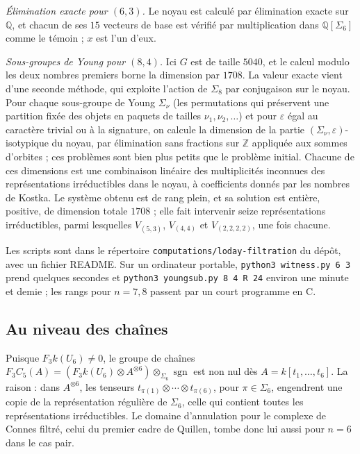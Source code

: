 \documentclass[11pt,a4paper]{amsart}
\theoremstyle{definition}
\theoremstyle{plain}
\theoremstyle{remark}
\newcommand{\Q}{\mathbb Q}
\newcommand{\sgn}{\operatorname{sgn}}
\begin{document}
\emph{Élimination exacte pour $(6, 3)$.} Le noyau est calculé par élimination exacte sur $\Q$, et chacun de ses $15$ vecteurs de base est vérifié par multiplication dans $\Q[\Sigma_6]$ comme le témoin ; $x$ est l'un d'eux.

\emph{Sous-groupes de Young pour $(8, 4)$.} Ici $G$ est de taille $5040$, et le calcul modulo les deux nombres premiers borne la dimension par $1708$. La valeur exacte vient d'une seconde méthode, qui exploite l'action de $\Sigma_8$ par conjugaison sur le noyau. Pour chaque sous-groupe de Young $\Sigma_\nu$ (les permutations qui préservent une partition fixée des objets en paquets de tailles $\nu_1, \nu_2, \dots$) et pour $\varepsilon$ égal au caractère trivial ou à la signature, on calcule la dimension de la partie $(\Sigma_\nu, \varepsilon)$-isotypique du noyau, par élimination sans fractions sur $\mathbb Z$ appliquée aux sommes d'orbites ; ces problèmes sont bien plus petits que le problème initial. Chacune de ces dimensions est une combinaison linéaire des multiplicités inconnues des représentations irréductibles dans le noyau, à coefficients donnés par les nombres de Kostka. Le système obtenu est de rang plein, et sa solution est entière, positive, de dimension totale $1708$ ; elle fait intervenir seize représentations irréductibles, parmi lesquelles $V_{(5,3)}$, $V_{(4,4)}$ et $V_{(2,2,2,2)}$, une fois chacune.

Les scripts sont dans le répertoire \texttt{computations/loday-filtration} du dépôt, avec un fichier README. Sur un ordinateur portable, \texttt{python3 witness.py 6 3} prend quelques secondes et \texttt{python3 youngsub.py 8 4 R 24} environ une minute et demie ; les rangs pour $n = 7, 8$ passent par un court programme en C.

\subsection{Au niveau des chaînes}

Puisque $F_3 k(U_6) \ne 0$, le groupe de chaînes $F_3 C_5(A) = (F_3 k(U_6) \otimes A^{\otimes 6}) \otimes_{\Sigma_6} \sgn$ est non nul dès $A = k[t_1, \dots, t_6]$. La raison : dans $A^{\otimes 6}$, les tenseurs $t_{\pi(1)} \otimes \cdots \otimes t_{\pi(6)}$, pour $\pi \in \Sigma_6$, engendrent une copie de la représentation régulière de $\Sigma_6$, celle qui contient toutes les représentations irréductibles. Le domaine d'annulation pour le complexe de Connes filtré, celui du premier cadre de Quillen, tombe donc lui aussi pour $n = 6$ dans le cas pair.
\end{document}
